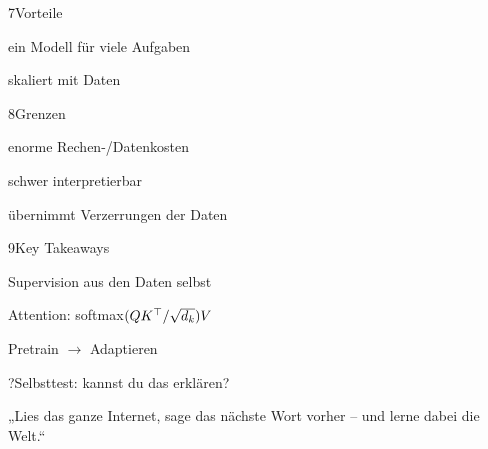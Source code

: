 \begin{hngrid}
\begin{hnp}[raster multicolumn=2,acc=hngreen]{7}{Vorteile}
\begin{hnpro}
\item ein Modell für viele Aufgaben
\item skaliert mit Daten
\end{hnpro}
\end{hnp}
%
\begin{hnp}[raster multicolumn=2,acc=hnred]{8}{Grenzen}
\begin{hncon}
\item enorme Rechen-/Datenkosten
\item schwer interpretierbar
\item übernimmt Verzerrungen der Daten
\end{hncon}
\end{hnp}
%
\begin{hnp}[raster multicolumn=2,acc=hnorange]{9}{Key Takeaways}
\begin{hnchk}
\item Supervision aus den Daten selbst
\item Attention: softmax$(QK^{\top}/\sqrt{d_k})V$
\item Pretrain $\to$ Adaptieren
\end{hnchk}
\end{hnp}
%
\begin{hnp}[raster multicolumn=6,acc=hnpurple,colback=hnlilac!30]{?}{Selbsttest: kannst du das erklären?}
\end{hnp}
%
\begin{hnbanner}[raster multicolumn=6]
„Lies das ganze Internet, sage das nächste Wort vorher -- und lerne dabei die Welt.“
\end{hnbanner}
\end{hngrid}
